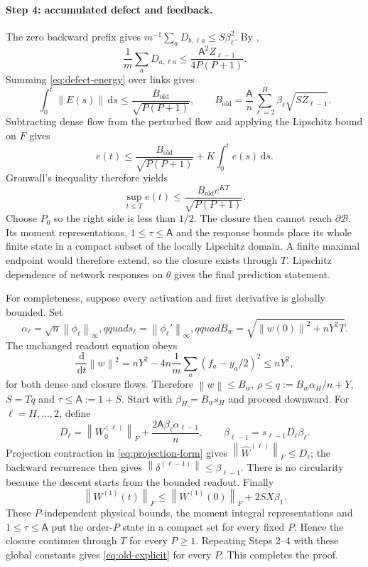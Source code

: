 \documentclass[11pt]{article}
\theoremstyle{definition}
\theoremstyle{remark}
\newcommand{\norm}[1]{\left\lVert #1\right\rVert}
\newcommand{\dd}{\,\mathrm{d}}
\begin{document}
\paragraph{Step 4: accumulated defect and feedback.}
The zero backward prefix gives
$m^{-1}\sum_aD_{b,\ell a}\le S\beta_\ell^2$.  By
,
\[
 \frac1m\sum_aD_{a,\ell a}
 \le\frac{\mathsf A^2\overline Z_{\ell-1}}{4P(P+1)}.
\]
Summing \eqref{eq:defect-energy} over links gives
\begin{equation}
 \int_0^t\norm{E(s)}\dd s
 \le\frac{B_{\mathrm{old}}}{\sqrt{P(P+1)}},\qquad
 B_{\mathrm{old}}=\frac{\mathsf A}{n}
 \sum_{\ell=2}^H\beta_\ell\sqrt{S\overline Z_{\ell-1}}. \label{eq:old-defect-bound}
\end{equation}
Subtracting dense flow from the perturbed flow and applying the Lipschitz
bound on $F$ gives
\[
 e(t)\le\frac{B_{\mathrm{old}}}{\sqrt{P(P+1)}}
 +K\int_0^te(s)\dd s.
\]
Gronwall's inequality therefore yields
\begin{equation}
 \sup_{t\le T}e(t)\le
 \frac{B_{\mathrm{old}}e^{KT}}{\sqrt{P(P+1)}}.       \label{eq:old-explicit}
\end{equation}
Choose $P_0$ so the right side is less than $1/2$.  The closure then cannot
reach $\partial\mathcal B$.  Its moment representations, $1\le\tau\le\mathsf A$
and the response bounds place its whole finite state in a compact subset of the
locally Lipschitz domain.  A finite maximal endpoint would therefore extend,
so the closure exists through $T$.  Lipschitz dependence of network responses
on $\theta$ gives the final prediction statement.

For completeness, suppose every activation and first derivative is globally
bounded.  Set
\[
 \alpha_\ell=\sqrt n\norm{\phi_\ell}_\infty,qquad
 s_\ell=\norm{\phi_\ell'}_\infty,qquad
 B_w=\sqrt{\norm{w(0)}^2+nY^2T}.
\]
The unchanged readout equation obeys
\[
 \frac{\dd}{\dd t}\norm w^2
 =nY^2-4n\frac1m\sum_a(f_a-y_a/2)^2\le nY^2,
\]
for both dense and closure flows.  Therefore
$\norm w\le B_w$, $\rho\le q:=B_w\alpha_H/n+Y$,
$S=Tq$ and $\tau\le\mathsf A:=1+S$.  Start with
$\beta_H=B_ws_H$ and proceed downward.  For $\ell=H,\ldots,2$, define
\[
 D_\ell=\norm{W_0^{(\ell)}}_F+
 \frac{2\mathsf A\beta_\ell\alpha_{\ell-1}}{n},
 \qquad \beta_{\ell-1}=s_{\ell-1}D_\ell\beta_\ell.
\]
Projection contraction in \eqref{eq:projection-form} gives
$\norm{\widehat W^{(\ell)}}_F\le D_\ell$; the backward recurrence then gives
$\norm{\delta^{(\ell-1)}}\le\beta_{\ell-1}$.  There is no circularity because
the descent starts from the bounded readout.  Finally
\[
 \norm{W^{(1)}(t)}_F\le\norm{W^{(1)}(0)}_F+2SX\beta_1.
\]
These $P$-independent physical bounds, the moment integral representations and
$1\le\tau\le\mathsf A$ put the order-$P$ state in a compact set for every
fixed $P$.  Hence the closure continues through $T$ for every $P\ge1$.
Repeating Steps 2--4 with these global constants gives
\eqref{eq:old-explicit} for every $P$.  This completes the proof.
\end{document}
